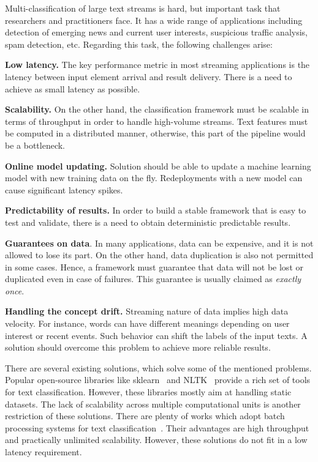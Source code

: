 \label {fs-short-intro}

Multi-classification of large text streams is hard, but important task that researchers and practitioners face. It has a wide range of applications including detection of emerging news and current user interests, suspicious traffic analysis, spam detection, etc. Regarding this task, the following challenges arise:

\textbf{Low latency.} The key performance metric in most streaming applications is the latency between input element arrival and result delivery. There is a need to achieve as small latency as possible.

\textbf{Scalability.} On the other hand, the classification framework must be scalable in terms of throughput in order to handle high-volume streams. Text features must be computed in a distributed manner, otherwise, this part of the pipeline would be a bottleneck.

\textbf{Online model updating.} Solution should be able to update a machine learning model with new training data on the fly. Redeployments with a new model can cause significant latency spikes.

\textbf{Predictability of results.} In order to build a stable framework that is easy to test and validate, there is a need to obtain deterministic predictable results. 

\textbf{Guarantees on data}. In many applications, data can be expensive, and it is not allowed to lose its part. On the other hand, data duplication is also not permitted in some cases. Hence, a framework must guarantee that data will not be lost or duplicated even in case of failures. This guarantee is usually claimed as {\em exactly once}.

\textbf{Handling the concept drift.} Streaming nature of data implies high data velocity. For instance, words can have different meanings depending on user interest or recent events. Such behavior can shift the labels of the input texts. A solution should overcome this problem to achieve more reliable results.

There are several existing solutions, which solve some of the mentioned problems. Popular open-source libraries like sklearn~\cite{sklearn_api} and NLTK~\cite{bird2009natural} provide a rich set of tools for text classification. However, these libraries mostly aim at handling static datasets. The lack of scalability across multiple computational units is another restriction of these solutions. There are plenty of works which adopt batch processing systems for text classification~\cite{semberecki2016distributed, svyatkovskiy2016large, baltas2016apache, Nodarakis2016LargeSS}. Their advantages are high throughput and practically unlimited scalability. However, these solutions do not fit in a low latency requirement.

